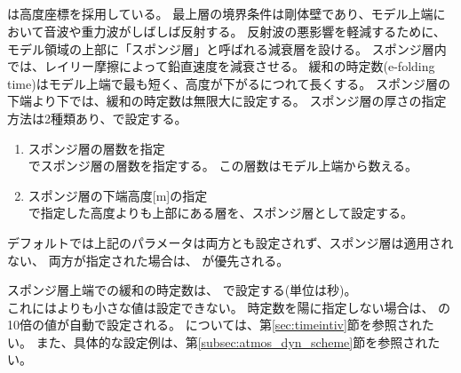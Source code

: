 \subsection{\SubsecRayleighDampingSetting} \label{subsec:raydamp}

\scalerm は高度座標を採用している。
最上層の境界条件は剛体壁であり、モデル上端において音波や重力波がしばしば反射する。
反射波の悪影響を軽減するために、モデル領域の上部に「スポンジ層」と呼ばれる減衰層を設ける。
スポンジ層内では、レイリー摩擦によって鉛直速度を減衰させる。
緩和の時定数(e-folding time)はモデル上端で最も短く、高度が下がるにつれて長くする。
スポンジ層の下端より下では、緩和の時定数は無限大に設定する。
スポンジ層の厚さの指定方法は2種類あり、で設定する。
\begin{enumerate}
\item スポンジ層の層数を指定\\
   でスポンジ層の層数を指定する。
  この層数はモデル上端から数える。
\item スポンジ層の下端高度[m]の指定\\
   で指定した高度よりも上部にある層を、スポンジ層として設定する。
\end{enumerate}

デフォルトでは上記のパラメータは両方とも設定されず、スポンジ層は適用されない、
両方が指定された場合は、 が優先される。

スポンジ層上端での緩和の時定数は、 で設定する(単位は秒)。\\
これにはよりも小さな値は設定できない。
時定数を陽に指定しない場合は、 の10倍の値が自動で設定される。
については、第\ref{sec:timeintiv}節を参照されたい。
また、具体的な設定例は、第\ref{subsec:atmos_dyn_scheme}節を参照されたい。



